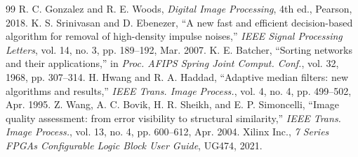 \documentclass[12pt,a4paper]{article}
\begin{document}
\newpage
\begin{thebibliography}{99}
 R. C. Gonzalez and R. E. Woods, \textit{Digital Image Processing}, 4th ed., Pearson, 2018.
 K. S. Srinivasan and D. Ebenezer, ``A new fast and efficient decision-based algorithm for removal of high-density impulse noises,'' \textit{IEEE Signal Processing Letters}, vol. 14, no. 3, pp. 189--192, Mar. 2007.
 K. E. Batcher, ``Sorting networks and their applications,'' in \textit{Proc. AFIPS Spring Joint Comput. Conf.}, vol. 32, 1968, pp. 307--314.
 H. Hwang and R. A. Haddad, ``Adaptive median filters: new algorithms and results,'' \textit{IEEE Trans. Image Process.}, vol. 4, no. 4, pp. 499--502, Apr. 1995.
 Z. Wang, A. C. Bovik, H. R. Sheikh, and E. P. Simoncelli, ``Image quality assessment: from error visibility to structural similarity,'' \textit{IEEE Trans. Image Process.}, vol. 13, no. 4, pp. 600--612, Apr. 2004.
 Xilinx Inc., \textit{7 Series FPGAs Configurable Logic Block User Guide}, UG474, 2021.
\end{thebibliography}
\end{document}
